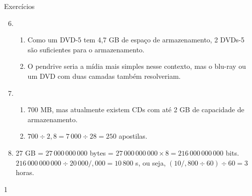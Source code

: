 \begin{answer}{Exercícios}
{\exerciselist
\begin{enumerate}\setcounter{enumi}{5}
\item 
\begin{enumerate}
\item Como um DVD-5 tem 4,7 GB de espaço de armazenamento, 2 DVDs-5 são suficientes para o armazenamento.

\item O pendrive seria a mídia mais simples nesse contexto, mas o blu-ray ou um DVD com duas camadas também resolveriam.
\end{enumerate}
\item 
\begin{enumerate}
\item 700 MB, mas atualmente existem CDs com até 2 GB de capacidade de armazenamento.

\item \(700 \div 2,8 = 7\,000 \div 28 = 250\) apostilas.
\end{enumerate}

\item 27 GB = \(27\,000\,000\,000\) bytes = \(27\,000\,000\,000 \times 8 = 216\,000\,000\,000\) bits. \(216\,000\,000\,000 \div 20\,000/,000 = 10\,800\) s, ou seja, \((10/,800 \div 60) \div 60 = 3\) horas.
\end{enumerate}
}{1}
\end{answer}
\clearmargin

